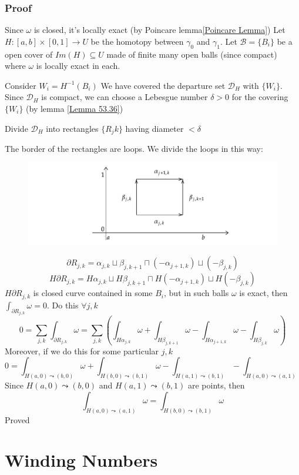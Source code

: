 \documentclass{book}
\begin{document}
\subsection*{Proof}
Since $\omega$ is closed, it's locally exact (by Poincare lemma\ref{Poincare Lemma}) Let $H:[a,b]\times[0,1]\rightarrow U$ be the homotopy between $\gamma_0$ and $\gamma_1$. Let $\mathscr{B}=\{B_i\}$ be a open cover of $Im(H)\subseteq U$ made of finite many open balls (since compact) where $\omega$ is locally exact in each. 

Consider $W_i=H^{-1}(B_i)$ We have covered the departure set $\mathscr{D}_H$ with $\{W_i\}$. Since $\mathscr{D}_H$ is compact, we can choose a Lebesgue number $\delta>0$ for the covering $\{W_i\}$ (by lemma \ref{Lemma 53.36})

Divide $\mathscr{D}_H$ into rectangles $\{R_jk\}$ having diameter $<\delta$

The border of the rectangles are loops. We divide the loops in this way:
\begin{figure}[h]
    \centering
    \includegraphics[width=\textwidth]{img/2.pdf}
\end{figure}
$$\partial R_{j,k}=\alpha_{j,k}\sqcup\beta_{j,k+1}\sqcap(-\alpha_{j+1,k})\sqcup(-\beta_{j,k})$$
$$H\partial R_{j,k}= H\alpha_{j,k}\sqcup H\beta_{j,k+1}\sqcap H(-\alpha_{j+1,k})\sqcup H(-\beta_{j,k})$$
$H\partial R_{j,k}$ is closed curve contained in some $B_i$, but in such balls $\omega$ is exact, then $\int_{\partial R_{j,k}}\omega=0$. Do this $\forall j,k$
$$0=\sum\limits_{j,k}\int_{\partial R_{j,k}}\omega=\sum\limits_{j,k}\left(\int_{H\alpha_{j,k}}\omega+\int_{H\beta_{j,k+1}}\omega-\int_{H\alpha_{j+1,k}}\omega-\int_{H\beta_{j,k}}\omega\right)$$
Moreover, if we do this for some particular $j,k$
$$0=\int_{H(a,0)\leadsto(b,0) }\omega+\int_{H(b,0)\leadsto(b,1)}\omega-\int_{H(a,1)\leadsto(b,1)}-\int_{H(a,0)\leadsto(a,1)}$$
Since $H(a,0)\leadsto(b,0)$ and $H(a,1)\leadsto(b,1)$ are points, then 
$$\int_{H(a,0)\leadsto(a,1)}\omega=\int_{H(b,0)\leadsto(b,1)}\omega$$
Proved
\chapter{Winding Numbers}
\end{document}
